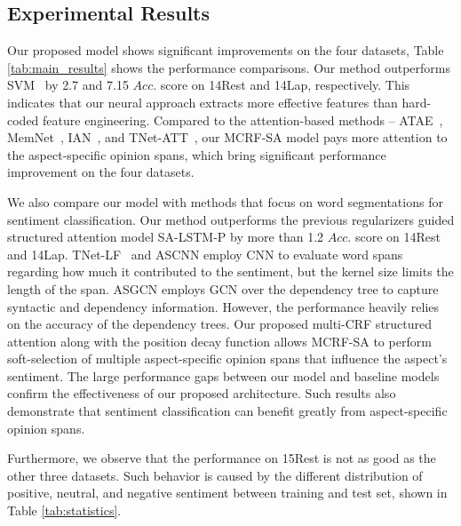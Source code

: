 \documentclass[11pt,a4paper]{article}
\begin{document}
 
\subsection{Experimental Results}
Our proposed model shows significant improvements on the four datasets, Table \ref{tab:main_results} shows the performance comparisons. 
Our method outperforms SVM~\cite{kiritchenko-EtAl:2014:SemEval} by 2.7 and 7.15 $Acc.$ score on 14Rest and 14Lap, respectively. 
This indicates that our neural approach extracts more effective features than hard-coded feature engineering. 
Compared to the attention-based methods -- ATAE~\cite{wang-etal-2016-attention}, MemNet~\cite{Tang2016AspectLS}, IAN~\cite{Ma2017InteractiveAN}, and TNet-ATT~\cite{Tang:ACL2019},  our MCRF-SA model pays more attention to the aspect-specific opinion spans, which bring significant performance improvement on the four datasets.

We also compare our model with methods that focus on word segmentations for sentiment classification. 
Our method outperforms the previous regularizers guided structured attention model SA-LSTM-P \cite{bailin-lu:2018:AAAI2018} by more than 1.2 $Acc.$ score on 14Rest and 14Lap. 
TNet-LF~\cite{lixin2018P18-1087} and ASCNN \cite{zhang-etal-2019-aspect} employ CNN to evaluate word spans regarding how much it contributed to the sentiment, but the kernel size limits the length of the span.
ASGCN \cite{zhang-etal-2019-aspect} employs GCN over the dependency tree to capture syntactic and dependency information. However, the performance heavily relies on the accuracy of the dependency trees.
Our proposed multi-CRF structured attention along with the position decay function allows MCRF-SA to perform soft-selection of multiple aspect-specific opinion spans that influence the aspect's sentiment. The large performance gaps between our model and baseline models confirm the effectiveness of our proposed architecture. Such results also demonstrate that sentiment classification can benefit greatly from aspect-specific opinion spans.

Furthermore, we observe that the performance on 15Rest is not as good as the other three datasets. Such behavior is caused by the different distribution of positive, neutral, and negative sentiment between training and test set, shown in Table \ref{tab:statistics}.
\end{document}
